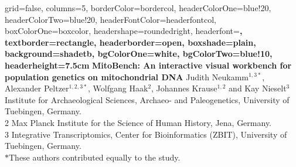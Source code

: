 \documentclass[a0paper,portrait]{baposter}
\begin{document}


\begin{poster}{
	grid=false,
	columns=5,
	borderColor=bordercol,
	headerColorOne=blue!20,
	headerColorTwo=blue!20,
	headerFontColor=headerfontcol,
	boxColorOne=boxcolor,
	headershape=roundedright,
	headerfont=\Large\sf\bf,
	textborder=rectangle,
	headerborder=open,
  boxshade=plain,
	background=shadetb,
	bgColorOne=white,
	bgColorTwo=blue!10,
	headerheight=7.5cm
}
{
}
{\sf\bf
	MitoBench: An interactive visual workbench for population genetics on mitochondrial DNA
}
{
	\vspace{1em} Judith Neukamm$^{1,3*}$, Alexander Peltzer$^{1,2,3*}$, Wolfgang Haak$^{2}$, Johannes Krause$^{1,2}$ and Kay Nieselt$^{3}$\\
	\vspace{1em}
	{ Institute for Archaeological Sciences, Archaeo- and Paleogenetics, University of Tuebingen, Germany.\\
	2 Max Planck Institute for the Science of Human History, Jena, Germany.\\
	3 Integrative Transcriptomics, Center for Bioinformatics (ZBIT), University of Tuebingen, Germany.\\
	$*$These authors contributed equally to the study.
	}
}
{
}
\end{poster}
\end{document}

